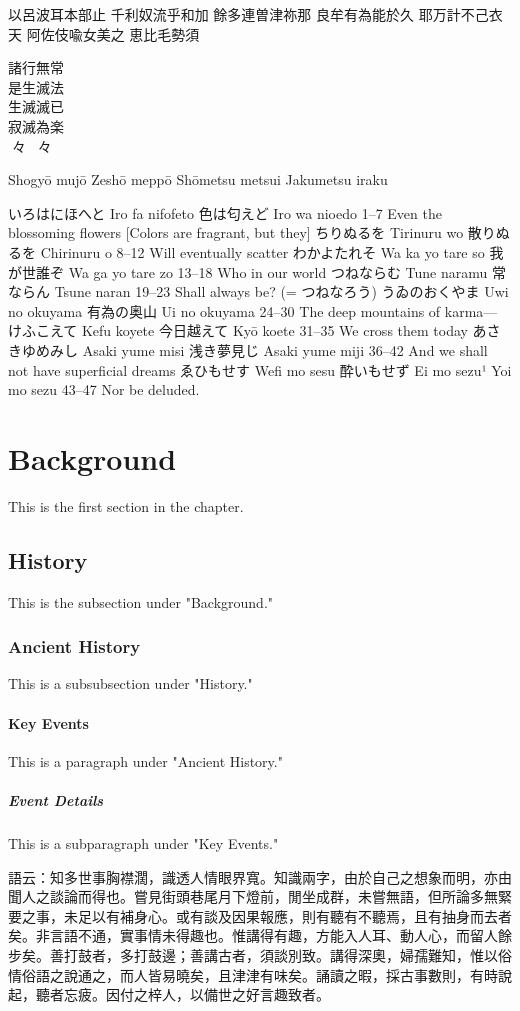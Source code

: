 \documentclass[a5paper, 10pt, openany]{book} %
\begin{document}
以呂波耳本部止
千利奴流乎和加
餘多連曽津祢那
良牟有為能於久
耶万計不己衣天
阿佐伎喩女美之
恵比毛勢須


諸行無常\\
是生滅法\\
生滅滅已\\
寂滅為楽\\

々々


Shogyō mujō
Zeshō meppō
Shōmetsu metsui
Jakumetsu iraku

いろはにほへと	Iro fa nifofeto	色は匂えど	Iro wa nioedo	1–7	Even the blossoming flowers [Colors are fragrant, but they]
ちりぬるを	Tirinuru wo	散りぬるを	Chirinuru o	8–12	Will eventually scatter
わかよたれそ	Wa ka yo tare so	我が世誰ぞ	Wa ga yo tare zo	13–18	Who in our world
つねならむ	Tune naramu	常ならん	Tsune naran	19–23	Shall always be? (= つねなろう)
うゐのおくやま	Uwi no okuyama	有為の奥山	Ui no okuyama	24–30	The deep mountains of karma—
けふこえて	Kefu koyete	今日越えて	Kyō koete	31–35	We cross them today
あさきゆめみし	Asaki yume misi	浅き夢見じ	Asaki yume miji	36–42	And we shall not have superficial dreams
ゑひもせす	Wefi mo sesu	酔いもせず	Ei mo sezu¹
Yoi mo sezu	43–47	Nor be deluded.


\section{Background}
This is the first section in the chapter.

\subsection{History}
This is the subsection under "Background."

\subsubsection{Ancient History}
This is a subsubsection under "History."

\paragraph{Key Events}
This is a paragraph under "Ancient History."

\subparagraph{Event Details}
This is a subparagraph under "Key Events."



語云：知多世事胸襟濶，識透人情眼界寬。知識兩字，由於自己之想象而明，亦由聞人之談論而得也。嘗見街頭巷尾月下燈前，閒坐成群，未嘗無語，但所論多無緊要之事，未足以有補身心。或有談及因果報應，則有聽有不聽焉，且有抽身而去者矣。非言語不通，實事情未得趣也。惟講得有趣，方能入人耳、動人心，而留人餘步矣。善打鼓者，多打鼓邊；善講古者，須談別致。講得深奧，婦孺難知，惟以俗情俗語之說通之，而人皆易曉矣，且津津有味矣。誦讀之暇，採古事數則，有時說起，聽者忘疲。因付之梓人，以備世之好言趣致者。\\ 
\end{document}
